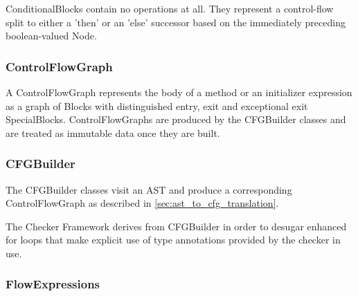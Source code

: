 

    ConditionalBlocks contain no operations at all.  They represent a control-flow split to either a 'then' or an 'else' successor based on the immediately preceding boolean-valued Node.

    
    


\subsubsection{ControlFlowGraph}
\label{sec:control_flow_graph_class}

     A ControlFlowGraph represents the body of a method or an initializer expression as a graph of Blocks with distinguished entry, exit and exceptional exit SpecialBlocks.  ControlFlowGraphs are produced by the CFGBuilder classes and are treated as immutable data once they are built.


\subsubsection{CFGBuilder}
\label{sec:cfg_builder_classes}
    
    The CFGBuilder classes visit an AST and produce a corresponding ControlFlowGraph as described in \autoref{sec:ast_to_cfg_translation}.
    
        
    The Checker Framework derives from CFGBuilder in order to desugar enhanced for loops that make explicit use of type annotations provided by the checker in use.
        


\subsubsection{FlowExpressions}
\label{sec:flow_expressions_class}

